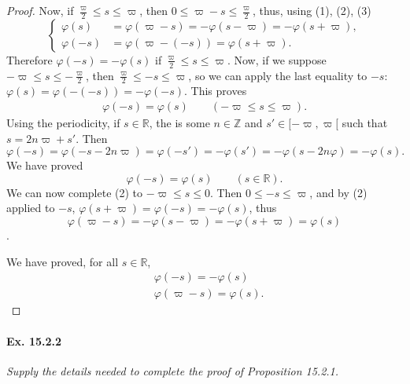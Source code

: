 \documentclass[11pt,a4paper]{article}
\newcommand{\Z}{\mathbb{Z}}
\newcommand{\R}{\mathbb{R}}
\begin{document}
\begin{proof}
Now, if $\frac{\varpi}{2} \leq s \leq \varpi$, then $0\leq \varpi-s \leq \frac{\varpi}{2}$, thus, using (1), (2), (3)
$$
\left\{
\begin{array}{ll}
\varphi(s) &= \varphi(\varpi - s) = -\varphi(s- \varpi) = -\varphi(s + \varpi),\\
\varphi(-s) &= \varphi(\varpi- (-s)) =\varphi(s + \varpi).
\end{array}
\right.
$$
Therefore $\varphi(-s) = - \varphi(s)$ if $\frac{\varpi}{2} \leq s \leq \varpi$. Now, if we suppose $-\varpi \leq s \leq -\frac{\varpi}{2}$, then $\frac{\varpi}{2} \leq -s \leq \varpi$, so we can apply the last equality to $-s$: $\varphi(s) = \varphi(-(-s))= - \varphi(-s)$. This proves
\begin{align}
\varphi(-s) = \varphi(s) \qquad (-\varpi \leq s \leq \varpi).
\end{align}
Using the periodicity, if $s \in \R$, the is some $n \in \Z$ and $s' \in [-\varpi,\varpi[$ such that $s = 2n\varpi + s'$. Then 
$$\varphi(-s) = \varphi(-s - 2n\varpi) = \varphi(-s') = - \varphi(s') = -\varphi(s-2n\varphi) = - \varphi(s).$$
 We have proved
$$\varphi(-s) = \varphi(s) \qquad (s \in \R).$$
We can now complete (2) to $-\varpi \leq s \leq 0$. Then $0 \leq -s \leq \varpi$, and by (2) applied to $-s$, $\varphi(s + \varpi) = \varphi(-s) = -\varphi(s)$, thus
$$\varphi(\varpi -s) =  - \varphi(s - \varpi) = - \varphi(s+ \varpi) = \varphi(s)$$.

We have proved, for all $s \in \R$,
\begin{align*}
&\varphi(-s) = -\varphi(s)\\
&\varphi(\varpi - s) = \varphi(s).
\end{align*}
\end{proof}

\paragraph{Ex. 15.2.2}{\it Supply the details needed to complete the proof of Proposition 15.2.1.
}
\end{document}
